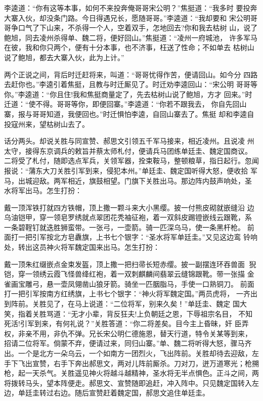 李逵道：“你有这等本事，如何不来投奔俺哥哥宋公明？”焦挺道：“我多时
要投奔大寨入伙，却没条门路。今日得遇兄长，愿随哥哥。”李逵道：“我却要和
宋公明哥哥争口气了下山来，不杀得一个人，空着双手，怎地回去?你和我去枯树
山，说了鲍旭，同去凌州杀得单、魏二将，便好回山。”焦挺道：“凌州一府城池，
许多军马在彼，我和你只两个，便有十分本事，也不济事，枉送了性命；不如单去
枯树山说了鲍旭，都去大寨入伙，此为上计。”

两个正说之间，背后时迁赶将来，叫道：“哥哥忧得作苦，便请回山。如今分
四路去赶你也。”李逵引着焦挺，且教与时迁厮见了。时迁劝李逵回山：“宋公明
哥哥等你。”李逵道：“你且住!我和焦挺商量定了，先去枯树山说了鲍旭，方才
回来。”时迁道：“使不得。哥哥等你，即便回寨。”李逵道：“你若不跟我去，
你自先回山寨，报与哥哥知道，我便回也。”时迁惧怕李逵，自回山寨去了。焦挺
却和李逵自投寇州来，望枯树山去了。

话分两头。却说关胜与同宣赞、郝思文引领五千军马接来，相近凌州。且说凌
州太守，接得东京调兵的敕旨并蔡太师札付，便请兵马团练单廷圭、魏定国商议。
二将受了札付，随即选点军兵，关领军器，拴束鞍马，整顿粮草，指日起行。忽闻
报说：“蒲东大刀关胜引军到来，侵犯本州。”单廷圭、魏定国听得大怒，便收拾
军马，出城迎敌。两军相近，旗鼓相望。门旗下关胜出马。那边阵内鼓声响处，圣
水将军出马。怎生打扮：

戴一顶浑铁打就四方铁帽，顶上撒一颗斗来大小黑缨。披一付熊皮砌就嵌缝沿
边乌油铠甲，穿一领皂罗绣就点翠团花秃袖征袍，着一双斜皮踢镫嵌线云跟靴，系
一条碧鞓钉就迭胜狮蛮带。一张弓，一壶箭。骑一匹深乌马，使一条黑杆枪。
前面打一把引军按北方皂纛旗，上书七个银字：“圣水将军单廷圭。”又见这边鸾
铃响处，转出这员神火将军魏定国来出马。怎生打扮：

戴一顶朱红缀嵌点金束发盔，顶上撒一把扫帚长短赤缨。披一副摆连环吞兽面
猊铠，穿一领绣云霞飞怪兽绛红袍，着一双刺麒麟间翡翠云缝锦跟靴。带一张描
金雀画宝雕弓，悬一壶凤翎凿山狼牙箭。骑坐一匹胭脂马，手使一口熟铜刀。
前面打一把引军按南方红绣旗，上书七个银字：“神火将军魏定国。”两员虎将，
一齐出到阵前。关胜见了，在马上说道：“二位将军，别来久矣！”单廷圭、魏定
国大笑，指着关胜骂道：“无才小辈，背反狂夫!上负朝廷之恩，下辱祖宗名目，
不知死活!引军到来，有何礼说？”关胜答道：“你二将差矣。目今主上昏昧，奸
臣弄权，非亲不用，非仇不弹。兄长宋公明仁德施恩，替天行道，特令关某等到来，
招请二位将军。倘蒙不弃，便请过来，同归山寨。”单、魏二将听得大怒，骤马齐
出。一个是北方一朵乌云，一个如南方一团烈火，飞出阵前。关胜却待去迎敌，左
手下飞出宣赞，右手下奔出郝思文，两对儿阵前厮杀。刀对刀，迸万道寒光；枪搠
枪，起一天杀气。关胜遥见神火将越斗越精神，圣水将无半点惧色。正斗之间，两
将拨转马头，望本阵便走。郝思文、宣赞随即追赶，冲入阵中。只见魏定国转入左
边，单廷圭转过右边。随后宣赞赶着魏定国，郝思文追住单廷圭。

